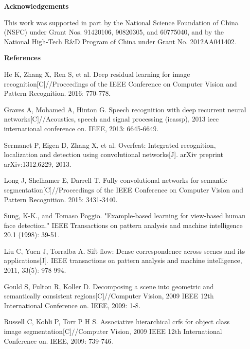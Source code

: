 \documentclass[10.5pt,compsoc]{TsT}
\theoremstyle{mystyle}
\begin{document}
{\vskip 2mm
\noindent
\textbf{Acknowledgements}
\vskip 2mm

\noindent
This work was supported in part by the National Science Foundation of China (NSFC) under Grant Nos. 91420106, 90820305, and 60775040, and by the National High-Tech R\&D Program of China under Grant No. 2012AA041402.

\vskip 2mm
\noindent
\textbf{References}
\vskip 2mm


\begin{thebibliography}{99}
 \addtolength{\itemsep}{-1em}
\vspace {1.5mm}


He K, Zhang X, Ren S, et al. Deep residual learning for image recognition[C]//Proceedings of the IEEE Conference on Computer Vision and Pattern Recognition. 2016: 770-778.

Graves A, Mohamed A, Hinton G. Speech recognition with deep recurrent neural networks[C]//Acoustics, speech and signal processing (icassp), 2013 ieee international conference on. IEEE, 2013: 6645-6649.

Sermanet P, Eigen D, Zhang X, et al. Overfeat: Integrated recognition, localization and detection using convolutional networks[J]. arXiv preprint arXiv:1312.6229, 2013.

Long J, Shelhamer E, Darrell T. Fully convolutional networks for semantic segmentation[C]//Proceedings of the IEEE Conference on Computer Vision and Pattern Recognition. 2015: 3431-3440.

Sung, K-K., and Tomaso Poggio. "Example-based learning for view-based human face detection." IEEE Transactions on pattern analysis and machine intelligence 20.1 (1998): 39-51.

Liu C, Yuen J, Torralba A. Sift flow: Dense correspondence across scenes and its applications[J]. IEEE transactions on pattern analysis and machine intelligence, 2011, 33(5): 978-994.

Gould S, Fulton R, Koller D. Decomposing a scene into geometric and semantically consistent regions[C]//Computer Vision, 2009 IEEE 12th International Conference on. IEEE, 2009: 1-8.

Russell C, Kohli P, Torr P H S. Associative hierarchical crfs for object class image segmentation[C]//Computer Vision, 2009 IEEE 12th International Conference on. IEEE, 2009: 739-746.



\end{thebibliography}}
\end{document}
